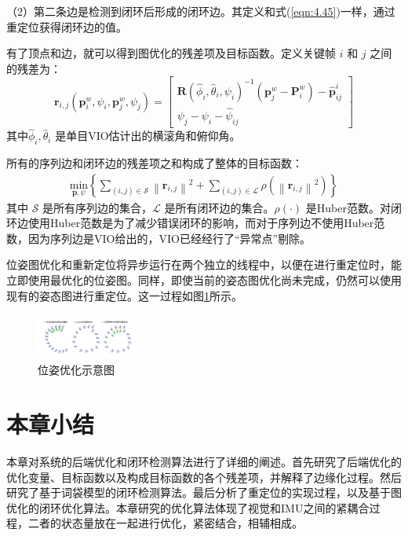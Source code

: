 （2）第二条边是检测到闭环后形成的闭环边。其定义和式(\ref{eqn:4.45})一样，通过重定位获得闭环边的值。

有了顶点和边，就可以得到图优化的残差项及目标函数。定义关键帧 $i$ 和 $j$ 之间的残差为：
\begin{equation}
\label{eqn:4.46}
\mathbf{r}_{i,j}(\mathbf{p}_i^w,\psi_i,\mathbf{p}_j^w,\psi_j)=\begin{bmatrix}
\mathbf{R}(\hat{\phi}_i,\hat{\theta}_i,\psi_i)^{-1}(\mathbf{p}_j^w-\mathbf{P}_i^w)-\hat{\mathbf{p}}_{ij}^i \\
\psi_j-\psi_i-\hat{\psi}_{ij}
\end{bmatrix}
\end{equation}
其中$\hat{\phi}_i,\hat{\theta}_i $ 是单目VIO估计出的横滚角和俯仰角。

所有的序列边和闭环边的残差项之和构成了整体的目标函数：
\begin{equation}
\label{eqn:4.47}
\begin{split}
\underset{\mathcal{\mathbf{p},\psi}}{\text{min}}
\left\{
\sum_{(i,j)\in\mathcal{S}}\left\| \mathbf{r}_{i,j} \right\|^2+\sum_{(i,j)\in\mathcal{L}}\rho(\left\| \mathbf{r}_{i,j} \right\|^2)
\right\}
\end{split}
\end{equation}
其中 $\mathcal{S} $ 是所有序列边的集合，$\mathcal{L} $ 是所有闭环边的集合。$\rho(\cdot) $  是Huber范数。对闭环边使用Huber范数是为了减少错误闭环的影响，而对于序列边不使用Huber范数，因为序列边是VIO给出的，VIO已经经行了“异常点”剔除。

位姿图优化和重新定位将异步运行在两个独立的线程中，以便在进行重定位时，能立即使用最优化的位姿图。同样，即使当前的姿态图优化尚未完成，仍然可以使用现有的姿态图进行重定位。这一过程如图\ref{fig4_9}所示。
\begin{figure}[h]\setlength{\belowcaptionskip}{-12pt}
	\centering
	\includegraphics[width=0.3\textwidth, angle=-90]{figures/chapter4/fig4_9}
	\caption{位姿优化示意图}\label{fig4_9}
\end{figure}
\section{本章小结}
本章对系统的后端优化和闭环检测算法进行了详细的阐述。首先研究了后端优化的优化变量、目标函数以及构成目标函数的各个残差项，并解释了边缘化过程。然后研究了基于词袋模型的闭环检测算法。最后分析了重定位的实现过程，以及基于图优化的闭环优化算法。本章研究的优化算法体现了视觉和IMU之间的紧耦合过程，二者的状态量放在一起进行优化，紧密结合，相辅相成。